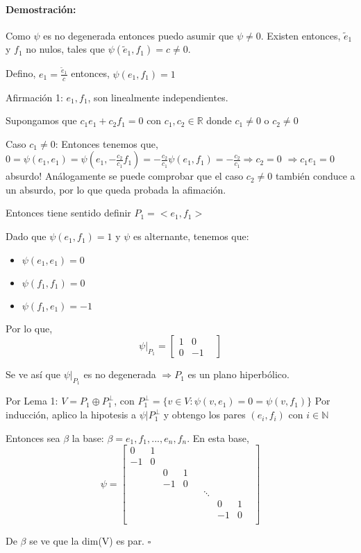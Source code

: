 \documentclass[12pt]{article}
\newenvironment{proof}{\paragraph{Demostración:}}{\hfill$\square$}
\begin{document}
\begin{proof}
Como $\psi$ es no degenerada entonces puedo asumir que $\psi \neq 0$.
Existen entonces, $\tilde{e}_1$ y $f_1$ no nulos, tales que $\psi(\tilde{e}_1,f_1)=c\neq0$.

Defino, $e_1=\frac{\tilde{e}_1}{c}$ entonces, $\psi(e_1,f_1)=1$

Afirmación 1: $e_1,f_1$, son linealmente independientes.

Supongamos que  $c_1 e_1 +c_2 f_1 = 0$ con $c_1,c_2 \in \mathbb{R}$  donde $c_1\neq0$ o  $c_2\neq0$

Caso $c_1\neq0$:
Entonces tenemos que,
$0=\psi(e_1,e_1)=\psi(e_1,- \frac{c_2}{c_1} f_1)= - \frac{c_2}{c_1} \psi(e_1,f_1)=- \frac{c_2}{c_1} \Rightarrow c_2=0$
$\Rightarrow c_1 e_1 = 0$ absurdo!
Análogamente se puede comprobar que el caso $c_2\neq0$ también conduce a un absurdo, por lo que queda probada la
afimación.

Entonces tiene sentido definir $P_1=<e_1,f_1>$
    
Dado que $\psi(e_1,f_1)=1$ y $\psi$ es alternante, tenemos que:
\begin{itemize}
 \item $\psi(e_1,e_1)=0$
 \item $\psi(f_1,f_1)=0$
 \item $\psi(f_1,e_1)=-1$
\end{itemize}

Por lo que, 
$$\psi|_{P_1} = 
\begin{bmatrix}
 1 & 0 &\\ 
 0& -1&
\end{bmatrix}
$$

Se ve así que $\psi|_{P_1}$ es no degenerada $\Rightarrow P_1$ es un plano hiperbólico.

Por Lema 1: $V=P_1 \oplus P_1^{\bot}$, con $P_1^{\bot}=\{v \in V : \psi(v,e_1)=0=\psi(v,f_1)\}$
Por inducción, aplico la hipotesis a $\psi|P_1^{\bot}$ y obtengo los pares $(e_i,f_i)$ con $i \in \mathbb{N}$

Entonces sea $\beta$ la base: $\beta={e_1,f_1,...,e_n,f_n}$.
En esta base, 
$$\psi = 
\begin{bmatrix}
 0 & 1 & & & & & & &\\ 
 -1& 0 & & & & & & &\\
 & & 0 & 1 & & & & &\\
 & & -1 & 0 & & & & &\\
 & &  &  & & \ddots & & &\\
 & &  &  & & & 0 & 1 &\\
 & &  &  & & & -1 & 0 &\\ 
\end{bmatrix}
$$

De $\beta$ se ve que la dim(V) es par. 
\end{proof}
\end{document}
